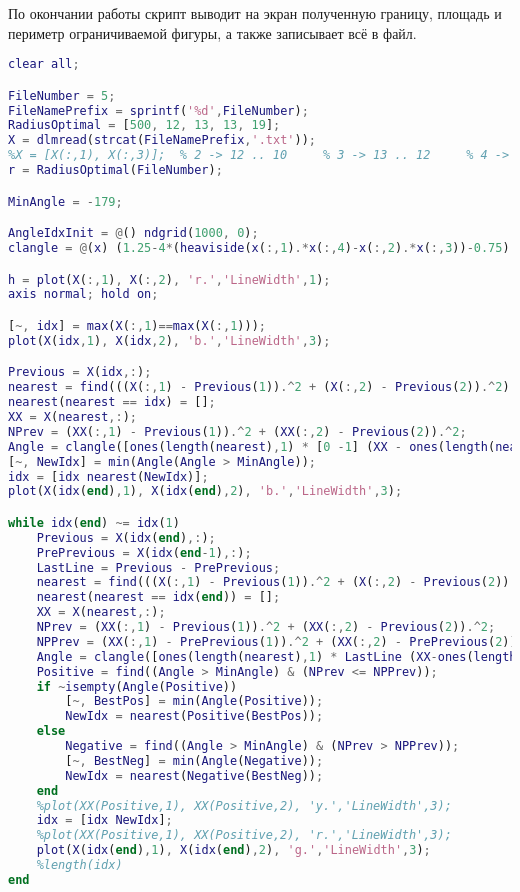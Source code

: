 По окончании работы скрипт выводит на экран полученную границу, площадь и периметр ограничиваемой фигуры, а также записывает всё в файл.
\newpage
{}
\newpage
{}
\newpage
{}
\begin{lstlisting}[language=matlab, frame=lines]
clear all;

FileNumber = 5;
FileNamePrefix = sprintf('%d',FileNumber);
RadiusOptimal = [500, 12, 13, 13, 19];
X = dlmread(strcat(FileNamePrefix,'.txt'));
%X = [X(:,1), X(:,3)];  % 2 -> 12 .. 10     % 3 -> 13 .. 12     % 4 -> 13 .. 11     % 5 -> 19 only
r = RadiusOptimal(FileNumber);

MinAngle = -179;

AngleIdxInit = @() ndgrid(1000, 0);
clangle = @(x) (1.25-4*(heaviside(x(:,1).*x(:,4)-x(:,2).*x(:,3))-0.75).^2) .*acos((x(:,1).*x(:,3)+x(:,2).*x(:,4))./sqrt((x(:,1).^2+ x(:,2).^2) .*(x(:,3).^2+ x(:,4).^2)))*180/pi;

h = plot(X(:,1), X(:,2), 'r.','LineWidth',1);
axis normal; hold on;

[~, idx] = max(X(:,1)==max(X(:,1)));
plot(X(idx,1), X(idx,2), 'b.','LineWidth',3);

Previous = X(idx,:);
nearest = find(((X(:,1) - Previous(1)).^2 + (X(:,2) - Previous(2)).^2) < r^2);
nearest(nearest == idx) = [];
XX = X(nearest,:);
NPrev = (XX(:,1) - Previous(1)).^2 + (XX(:,2) - Previous(2)).^2;
Angle = clangle([ones(length(nearest),1) * [0 -1] (XX - ones(length(nearest),1) * Previous)]);
[~, NewIdx] = min(Angle(Angle > MinAngle));
idx = [idx nearest(NewIdx)];
plot(X(idx(end),1), X(idx(end),2), 'b.','LineWidth',3);

while idx(end) ~= idx(1)
    Previous = X(idx(end),:);
    PrePrevious = X(idx(end-1),:);
    LastLine = Previous - PrePrevious;
    nearest = find(((X(:,1) - Previous(1)).^2 + (X(:,2) - Previous(2)).^2) < r^2);
    nearest(nearest == idx(end)) = [];
    XX = X(nearest,:);
    NPrev = (XX(:,1) - Previous(1)).^2 + (XX(:,2) - Previous(2)).^2;
    NPPrev = (XX(:,1) - PrePrevious(1)).^2 + (XX(:,2) - PrePrevious(2)).^2;
    Angle = clangle([ones(length(nearest),1) * LastLine (XX-ones(length(nearest),1)*Previous) ] );
    Positive = find((Angle > MinAngle) & (NPrev <= NPPrev));
    if ~isempty(Angle(Positive))
        [~, BestPos] = min(Angle(Positive));
        NewIdx = nearest(Positive(BestPos));
    else
        Negative = find((Angle > MinAngle) & (NPrev > NPPrev));
        [~, BestNeg] = min(Angle(Negative));
        NewIdx = nearest(Negative(BestNeg));
    end
    %plot(XX(Positive,1), XX(Positive,2), 'y.','LineWidth',3);
    idx = [idx NewIdx];
    %plot(XX(Positive,1), XX(Positive,2), 'r.','LineWidth',3);
    plot(X(idx(end),1), X(idx(end),2), 'g.','LineWidth',3);
    %length(idx)
end


\end{lstlisting}
